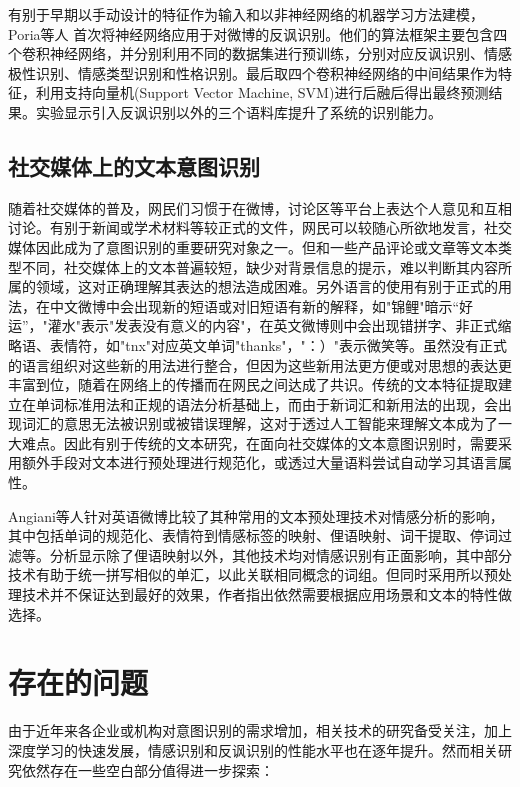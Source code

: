 有别于早期以手动设计的特征作为输入和以非神经网络的机器学习方法建模，Poria等人 \cite{poria2016deeper} 首次将神经网络应用于对微博的反讽识别。他们的算法框架主要包含四个卷积神经网络，并分别利用不同的数据集进行预训练，分别对应反讽识别、情感极性识别、情感类型识别和性格识别。最后取四个卷积神经网络的中间结果作为特征，利用支持向量机(Support Vector Machine, SVM)进行后融后得出最终预测结果。实验显示引入反讽识别以外的三个语料库提升了系统的识别能力。

\subsection{社交媒体上的文本意图识别}

随着社交媒体的普及，网民们习惯于在微博，讨论区等平台上表达个人意见和互相讨论。有别于新闻或学术材料等较正式的文件，网民可以较随心所欲地发言，社交媒体因此成为了意图识别的重要研究对象之一。但和一些产品评论或文章等文本类型不同，社交媒体上的文本普遍较短\cite{Madhusudhanan2018survey}，缺少对背景信息的提示，难以判断其内容所属的领域，这对正确理解其表达的想法造成困难。另外语言的使用有别于正式的用法，在中文微博中会出现新的短语或对旧短语有新的解释\cite{xie2012jiyu}，如"锦鲤"暗示“好运”，"灌水"表示"发表没有意义的内容"，在英文微博则中会出现错拼字、非正式缩略语、表情符\cite{go2009twitter}\cite{paltoglou2012twitter}，如"tnx"对应英文单词"thanks"，"：）"表示微笑等。虽然没有正式的语言组织对这些新的用法进行整合，但因为这些新用法更方便或对思想的表达更丰富到位，随着在网络上的传播而在网民之间达成了共识。传统的文本特征提取建立在单词标准用法和正规的语法分析基础上，而由于新词汇和新用法的出现，会出现词汇的意思无法被识别或被错误理解，这对于透过人工智能来理解文本成为了一大难点。因此有别于传统的文本研究，在面向社交媒体的文本意图识别时，需要采用额外手段对文本进行预处理进行规范化，或透过大量语料尝试自动学习其语言属性。

Angiani等人\cite{angiani2016comparison}针对英语微博比较了其种常用的文本预处理技术对情感分析的影响，其中包括单词的规范化、表情符到情感标签的映射、俚语映射、词干提取、停词过滤等。分析显示除了俚语映射以外，其他技术均对情感识别有正面影响，其中部分技术有助于统一拼写相似的单汇，以此关联相同概念的词组。但同时采用所以预处理技术并不保证达到最好的效果，作者指出依然需要根据应用场景和文本的特性做选择。

\section{存在的问题}

由于近年来各企业或机构对意图识别的需求增加，相关技术的研究备受关注，加上深度学习的快速发展，情感识别和反讽识别的性能水平也在逐年提升。然而相关研究依然存在一些空白部分值得进一步探索：

